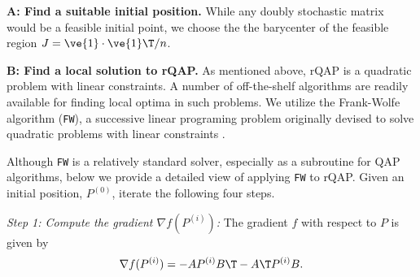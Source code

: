 \documentclass{article} %
\begin{document}
\textbf{A: Find a suitable initial position.}  While any doubly stochastic matrix would be a feasible initial point, we choose the 
 the barycenter of the feasible region
$J=\ve{1} \cdot \ve{1}\T/n$. %


\textbf{B: Find a local solution to rQAP.} As mentioned above, rQAP is a quadratic problem with linear constraints.  A number of off-the-shelf algorithms are readily available for finding local optima in such problems.  We utilize the Frank-Wolfe algorithm (\texttt{FW}), a successive linear programing problem originally devised to solve quadratic problems with linear constraints \cite{Frank1956}.

Although \texttt{FW} is a relatively standard solver, especially as a subroutine for QAP algorithms, below we provide a detailed view of applying \texttt{FW} to rQAP.
Given an initial position, $P^{(0)}$, iterate the following four steps.

\emph{Step 1: Compute the gradient $\nabla f(P^{(i)})$:}  The gradient $f$ with respect to $P$ is given by
\begin{align*} \label{eq:grad}
	\nabla f (P^{(i)}) = 
	  - A P^{(i)} B\T - A\T P^{(i)} B.
\end{align*}
\end{document}
